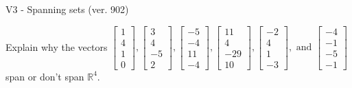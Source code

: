 \begin{exercise}
  \begin{exerciseTitle}V3 - Spanning sets (ver. 902)\end{exerciseTitle}
  \begin{exerciseStatement}
    Explain why the vectors \(\left[\begin{array}{r}
1 \\
4 \\
1 \\
0
\end{array}\right] , \left[\begin{array}{r}
3 \\
4 \\
-5 \\
2
\end{array}\right] , \left[\begin{array}{r}
-5 \\
-4 \\
11 \\
-4
\end{array}\right] , \left[\begin{array}{r}
11 \\
4 \\
-29 \\
10
\end{array}\right] , \left[\begin{array}{r}
-2 \\
4 \\
1 \\
-3
\end{array}\right] , \text{ and } \left[\begin{array}{r}
-4 \\
-1 \\
-5 \\
-1
\end{array}\right]\) span or don't span \(\mathbb{R}^4\). 
	



\end{exerciseStatement}
\end{exercise}
